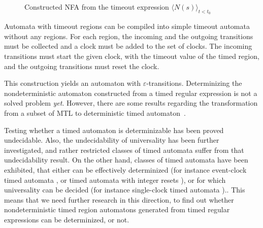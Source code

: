 			
			\begin{figure}[h]
				\centering
				\caption{Constructed NFA from the timeout expression $\langle N(s) \rangle_{t<t_0}$}
				\label{fig:cep:nfatimed}
			\end{figure}
			
			
			Automata with timeout regions can be compiled into simple timeout automata without any regions. 
			For each region, the incoming and the outgoing transitions must be collected and a clock must be added to the set of clocks.
			The incoming transitions must start the given clock, with the timeout value of the timed region, and the outgoing transitions must reset the clock.
			
		
			This construction yields an automaton with $\varepsilon$-transitions. Determinizing the nondeterministic automaton constructed from a timed regular expression is not a solved problem \emph{yet}. However, there are some results regarding the transformation from a subset of MTL to deterministic timed automaton~\citep{nivckovic2010mtl}.
			
			Testing whether a timed automaton is determinizable has been proved undecidable\citep{finkel2006undecidable}.
			Also, the undecidability of universality has been further investigated, and rather restricted classes of timed automata suffer from that undecidability result. On the other hand, classes of timed automata have been exhibited, that either can be effectively determinized (for instance event-clock timed automata \citep{alur1994determinizable}, or timed automata
			with integer resets \citep{suman2008timed}), or for which universality can be decided (for instance single-clock timed automata \citep{ouaknine2004language}).\citep{baier2009timed}.
			This means that we need further research in this direction, to find out whether nondeterministic timed region automatons generated from timed regular expressions can be determinized, or not.
			

